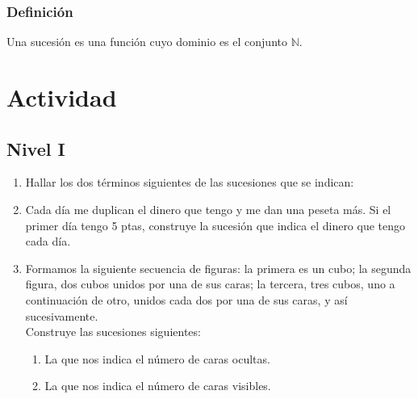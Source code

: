 \documentclass[twoside]{article}
\begin{document}
\subsubsection*{Definici\'{o}n}
Una sucesi\'{o}n es una función cuyo dominio es el conjunto $\mathbb{N}$.
\section*{Actividad}
\subsection*{Nivel I}
\begin{enumerate}
\item Hallar los dos términos siguientes de las sucesiones que se indican:
\begin{enumerate}
\end{enumerate}
\item Cada día me duplican el dinero que tengo y me dan una peseta más. Si el primer día tengo 5 ptas, construye la sucesión que indica el dinero que tengo cada día.
\item Formamos la siguiente secuencia de figuras: la primera es un cubo; la segunda figura, dos cubos unidos por una de sus caras; la tercera, tres cubos, uno a continuación de otro, unidos cada dos por una de sus caras, y así sucesivamente.\\
Construye las sucesiones siguientes:
\begin{enumerate}
\item La que nos indica el número de caras ocultas.
\item La que nos indica el número de caras visibles.\\

\end{enumerate}
\end{enumerate}
\end{document}
